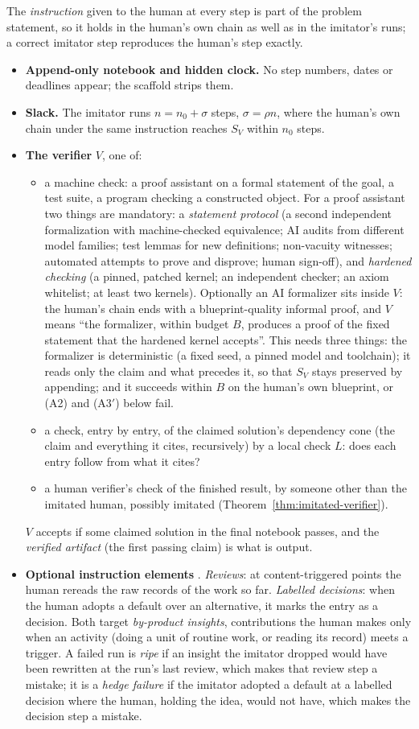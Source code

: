 \documentclass[11pt]{article}
\theoremstyle{definition}
\theoremstyle{remark}
\newcommand{\Sv}{S_{V}}
\begin{document}
The \emph{instruction} given to the human at every step is part of the problem statement, so it holds in the human's own chain as well as in the imitator's runs; a correct imitator step reproduces the human's step exactly.
\begin{itemize}
\item \textbf{Append-only notebook and hidden clock.} No step numbers, dates or deadlines appear; the scaffold strips them.
\item \textbf{Slack.} The imitator runs $n=n_0+\sigma$ steps, $\sigma=\rho n$, where the human's own chain under the same instruction reaches $\Sv$ within $n_0$ steps.
\item \textbf{The verifier} $V$, one of:
\begin{itemize}[nosep]
\item[(V-machine)] a machine check: a proof assistant on a formal statement of the goal, a test suite, a program checking a constructed object. For a proof assistant two things are mandatory: a \emph{statement protocol} (a second independent formalization with machine-checked equivalence; AI audits from different model families; test lemmas for new definitions; non-vacuity witnesses; automated attempts to prove and disprove; human sign-off), and \emph{hardened checking} (a pinned, patched kernel; an independent checker; an axiom whitelist; at least two kernels). Optionally an AI formalizer sits inside $V$: the human's chain ends with a blueprint-quality informal proof, and $V$ means ``the formalizer, within budget $B$, produces a proof of the fixed statement that the hardened kernel accepts''. This needs three things: the formalizer is deterministic (a fixed seed, a pinned model and toolchain); it reads only the claim and what precedes it, so that $\Sv$ stays preserved by appending; and it succeeds within $B$ on the human's own blueprint, or (A2) and (A3$'$) below fail.
\item[(V-cone)] a check, entry by entry, of the claimed solution's dependency cone (the claim and everything it cites, recursively) by a local check $L$: does each entry follow from what it cites?
\item[(V-human)] a human verifier's check of the finished result, by someone other than the imitated human, possibly imitated (Theorem~\ref{thm:imitated-verifier}).
\end{itemize}
$V$ accepts if some claimed solution in the final notebook passes, and the \emph{verified artifact} (the first passing claim) is what is output.
\item \textbf{Optional instruction elements} \cite{threadG}. \emph{Reviews}: at content-triggered points the human rereads the raw records of the work so far. \emph{Labelled decisions}: when the human adopts a default over an alternative, it marks the entry as a decision. Both target \emph{by-product insights}, contributions the human makes only when an activity (doing a unit of routine work, or reading its record) meets a trigger. A failed run is \emph{ripe} if an insight the imitator dropped would have been rewritten at the run's last review, which makes that review step a mistake; it is a \emph{hedge failure} if the imitator adopted a default at a labelled decision where the human, holding the idea, would not have, which makes the decision step a mistake.

\end{itemize}
\end{document}
